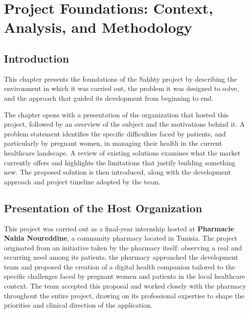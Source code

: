 \chapter{Project Foundations: Context, Analysis, and Methodology}

\section{Introduction}

This chapter presents the foundations of the Sahhty project by describing the environment
in which it was carried out, the problem it was designed to solve, and the approach that
guided its development from beginning to end.

The chapter opens with a presentation of the organization that hosted this project, followed
by an overview of the subject and the motivations behind it. A problem statement identifies
the specific difficulties faced by patients, and particularly by pregnant women, in managing
their health in the current healthcare landscape. A review of existing solutions examines
what the market currently offers and highlights the limitations that justify building something
new. The proposed solution is then introduced, along with the development approach and
project timeline adopted by the team.

\section{Presentation of the Host Organization}

This project was carried out as a final-year internship hosted at \textbf{Pharmacie Nahla
Noureddine}, a community pharmacy located in Tunisia. The project originated from an
initiative taken by the pharmacy itself: observing a real and recurring need among its
patients, the pharmacy approached the development team and proposed the creation of a
digital health companion tailored to the specific challenges faced by pregnant women and
patients in the local healthcare context. The team accepted this proposal and worked
closely with the pharmacy throughout the entire project, drawing on its professional
expertise to shape the priorities and clinical direction of the application.

